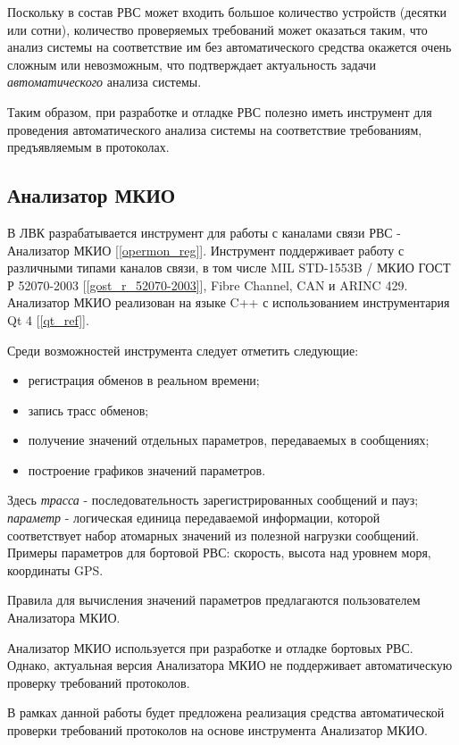 Поскольку в состав РВС может входить большое количество устройств (десятки или 
сотни), количество проверяемых требований может оказаться таким, что анализ 
системы на соответствие им без автоматического средства окажется очень сложным 
или невозможным, что подтверждает актуальность задачи \textit{автоматического} 
анализа системы.

Таким образом, при разработке и отладке РВС полезно иметь инструмент для 
проведения автоматического анализа системы на соответствие требованиям, 
предъявляемым в протоколах.

\subsection{Анализатор МКИО}

В ЛВК разрабатывается инструмент для работы с каналами связи РВС -  
Анализатор МКИО [\ref{opermon_reg}]. Инструмент поддерживает работу с  
различными типами каналов связи, в том числе MIL STD-1553B / МКИО ГОСТ Р 
52070-2003 [\ref{gost_r_52070-2003}], Fibre Channel, CAN и ARINC 429. 
Анализатор МКИО реализован на языке C++ с использованием инструментария Qt 4 
[\ref{qt_ref}].

Среди возможностей инструмента следует отметить следующие:

\begin{itemize}
 \item регистрация обменов в реальном времени;
 \item запись трасс обменов;
 \item получение значений отдельных параметров, передаваемых в сообщениях;
 \item построение графиков значений параметров.
\end{itemize}

Здесь \textit{трасса} - последовательность зарегистрированных сообщений и пауз; 
\textit{параметр} - логическая единица передаваемой информации, которой 
соответствует набор атомарных значений из полезной нагрузки сообщений. Примеры 
параметров для бортовой РВС: скорость, высота над уровнем моря, координаты GPS.

Правила для вычисления значений параметров предлагаются пользователем 
Анализатора МКИО.

Анализатор МКИО используется при разработке и отладке бортовых РВС. Однако, 
актуальная версия Анализатора МКИО не поддерживает автоматическую проверку 
требований протоколов. 

В рамках данной работы будет предложена реализация средства автоматической 
проверки требований протоколов на основе инструмента Анализатор МКИО.